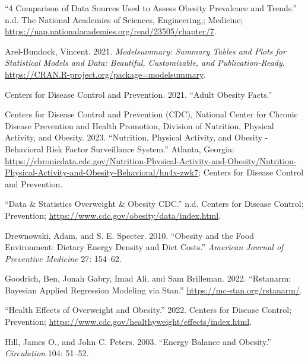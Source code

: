 \documentclass[
  letterpaper,
  DIV=11,
  numbers=noendperiod]{scrartcl}
\newlength{\cslhangindent}
\newlength{\cslentryspacingunit} %
\newenvironment{CSLReferences}[2] %
 {%
  \setlength{\parindent}{0pt}
  \ifodd #1
  \let\oldpar\par
  \def\par{\hangindent=\cslhangindent\oldpar}
  \fi
  \setlength{\parskip}{#2\cslentryspacingunit}
 }%
 {}
\begin{document}
\hypertarget{refs}{}
\begin{CSLReferences}{1}{0}
\leavevmode{}%
{``4 Comparison of Data Sources Used to Assess Obesity Prevalence and
Trends.''} n.d. The National Academies of Sciences, Engineering,;
Medicine; \url{https://nap.nationalacademies.org/read/23505/chapter/7}.

\leavevmode{}%
Arel-Bundock, Vincent. 2021. \emph{Modelsummary: Summary Tables and
Plots for Statistical Models and Data: Beautiful, Customizable, and
Publication-Ready}.
\url{https://CRAN.R-project.org/package=modelsummary}.

\leavevmode{}%
Centers for Disease Control and Prevention. 2021. {``Adult Obesity
Facts.''}

\leavevmode{}%
Centers for Disease Control and Prevention (CDC), National Center for
Chronic Disease Prevention and Health Promotion, Division of Nutrition,
Physical Activity, and Obesity. 2023. {``{Nutrition, Physical Activity,
and Obesity - Behavioral Risk Factor Surveillance System}.''} Atlanta,
Georgia:
\url{https://chronicdata.cdc.gov/Nutrition-Physical-Activity-and-Obesity/Nutrition-Physical-Activity-and-Obesity-Behavioral/hn4x-zwk7};
{Centers for Disease Control and Prevention}.

\leavevmode{}%
{``Data \& Statistics \textbar{} Overweight \& Obesity \textbar{}
CDC.''} n.d. Centers for Disease Control; Prevention;
\url{https://www.cdc.gov/obesity/data/index.html}.

\leavevmode{}%
Drewnowski, Adam, and S. E. Specter. 2010. {``Obesity and the Food
Environment: Dietary Energy Density and Diet Costs.''} \emph{American
Journal of Preventive Medicine} 27: 154--62.

\leavevmode{}%
Goodrich, Ben, Jonah Gabry, Imad Ali, and Sam Brilleman. 2022.
{``Rstanarm: {Bayesian} Applied Regression Modeling via {Stan}.''}
\url{https://mc-stan.org/rstanarm/}.

\leavevmode{}%
{``Health Effects of Overweight and Obesity.''} 2022. Centers for
Disease Control; Prevention;
\url{https://www.cdc.gov/healthyweight/effects/index.html}.

\leavevmode{}%
Hill, James O., and John C. Peters. 2003. {``Energy Balance and
Obesity.''} \emph{Circulation} 104: 51--52.


\end{CSLReferences}
\end{document}
